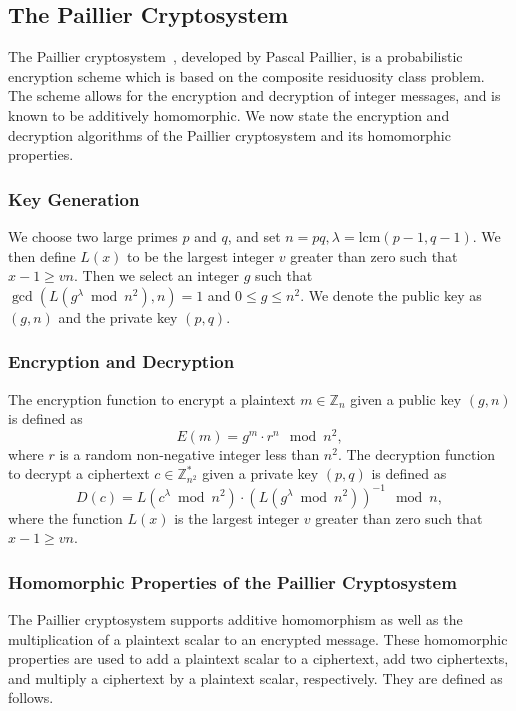 \subsection{The Paillier Cryptosystem}
The Paillier cryptosystem~\cite{stern_public-key_1999}, developed by Pascal Paillier, is a probabilistic encryption scheme which is based on the composite residuosity class problem. The scheme allows for the encryption and decryption of integer messages, and is known to be additively homomorphic. We now state the encryption and decryption algorithms of the Paillier cryptosystem and its homomorphic properties.

\subsubsection{Key Generation}
We choose two large primes $p$ and $q$, and set $n = pq, \lambda = \mathrm{lcm}\left(p-1,q-1\right)$.
We then define $L\left(x\right)$ to be the largest integer $v$ greater than zero such that $x-1 \geq vn$.
Then we select an integer $g$ such that $\gcd\left(L\left(g^\lambda \bmod n^2\right), n\right) = 1$ and $0\leq g \leq n^2$.
We denote the public key as $(g,n)$ and the private key $(p,q)$.
\subsubsection{Encryption and Decryption}
The encryption function to encrypt a plaintext $m \in \mathbb{Z}_n$ given a public key $(g,n)$ is defined as
\begin{equation*}
	E\left(m\right) = g^m \cdot r^n \mod{n^2},
\end{equation*}
where $r$ is a random non-negative integer less than $n^2$.
The decryption function to decrypt a ciphertext $c \in \mathbb{Z}^*_{n^2}$ given a private key $(p,q)$ is defined as
\begin{equation*}
	D\left(c\right) = L\left(c^\lambda \bmod n^2\right) \cdot \left(L\left(g^\lambda \bmod n^2\right)\right)^{-1} \mod n,
\end{equation*}
where the function $L(x)$ is the largest integer $v$ greater than zero such that $x-1 \geq vn$.
\subsubsection{Homomorphic Properties of the Paillier Cryptosystem}
The Paillier cryptosystem supports additive homomorphism as well as the multiplication of a plaintext scalar to an encrypted message. These homomorphic properties are used to add a plaintext scalar to a ciphertext, add two ciphertexts, and multiply a ciphertext by a plaintext scalar, respectively. They are defined as follows.

